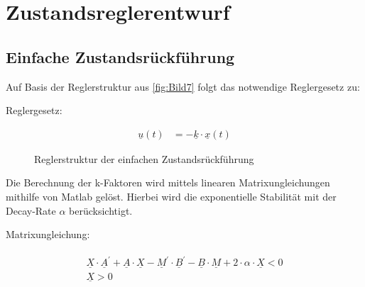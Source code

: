 \section{Zustandsreglerentwurf} \label{sec:Zustandsreglerentwurf}

\subsection{Einfache Zustandsrückführung} \label{sec:Einfach}

Auf Basis der Reglerstruktur aus \autoref{fig:Bild7} folgt das notwendige Reglergesetz zu:\\
\newline

Reglergesetz:

\begin{align}
    \underline{u}(t) &= -\underline{k}\cdot\underline{x}(t)
    \label{eq:Gleichung19}
\end{align}

\begin{figure}[H]
   \centering
   \caption[Reglerstruktur der einfache Zustandsrückführung]{Reglerstruktur der einfachen Zustandsrückführung}
   \label{fig:Bild7}
\end{figure}

Die Berechnung der k-Faktoren wird mittels linearen Matrixungleichungen mithilfe von Matlab gelöst. Hierbei wird die exponentielle Stabilität mit der Decay-Rate $\alpha$ berücksichtigt.\\
\newline

Matrixungleichung:

\begin{align}
        \begin{split}
        \underline{X}\cdot \underline{A}^'+\underline{A}\cdot\underline{X} -\underline{M}^'\cdot\underline{B}^' - \underline{B}\cdot \underline{M} +2\cdot\alpha\cdot \underline{X} < 0 \\
    \underline{X} > 0
    \end{split}
    \label{eq:Gleichung20}
\end{align}

